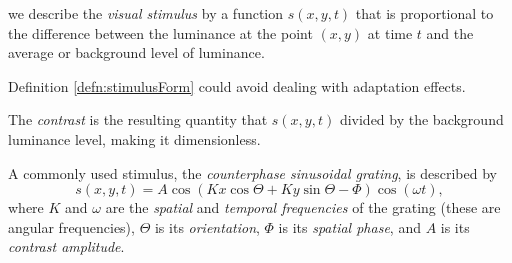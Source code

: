 \begin{defn}
  \label{defn:stimulusForm}
  we describe the \emph{visual stimulus} by a function $s(x,y,t)$ that is proportional to the difference between the luminance at the point $(x,y)$ at time $t$ and the average or background level of luminance.
\end{defn}

\begin{rem}
  Definition \ref{defn:stimulusForm} could avoid dealing with adaptation effects.
\end{rem}

\begin{defn}
  \label{def:contrast}
  The \emph{contrast} is the resulting quantity that $s(x,y,t)$ divided by the background luminance level, making it dimensionless.
\end{defn}
\begin{defn}
  \label{def:counterphaseSinusoidalGrating}
  A commonly used stimulus, the \emph{counterphase sinusoidal grating}, is described by
  \begin{equation}
    \label{equ:2.18}
    s(x,y,t) = A\cos(Kx\cos\Theta + Ky\sin\Theta-\Phi)\cos(\omega t),
  \end{equation}
  where $K$ and $\omega$ are the \emph{spatial} and \emph{temporal frequencies} of the grating (these are angular frequencies), $\Theta$ is its \emph{orientation}, $\Phi$ is its \emph{spatial phase}, and $A$ is its \emph{contrast amplitude}.
\end{defn}

